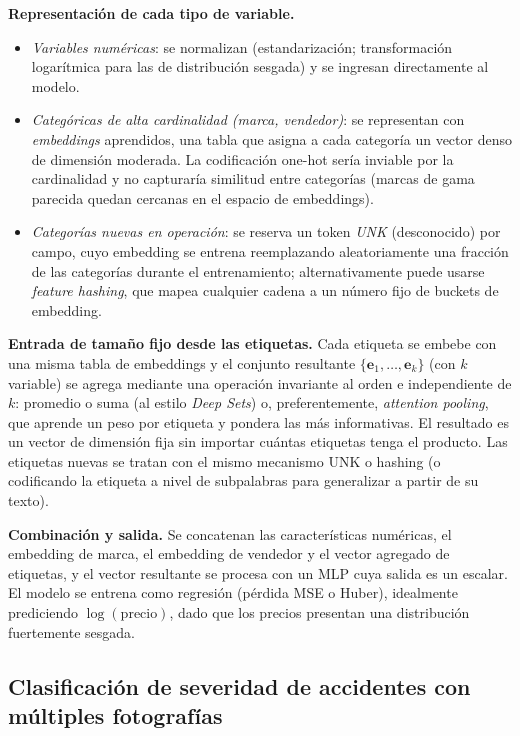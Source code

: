 \documentclass[12pt, a4paper]{article}
\begin{document}
\textbf{Representación de cada tipo de variable.}
\begin{itemize}[leftmargin=2em]
  \item \emph{Variables numéricas}: se normalizan (estandarización; transformación
        logarítmica para las de distribución sesgada) y se ingresan directamente al modelo.
  \item \emph{Categóricas de alta cardinalidad (marca, vendedor)}: se representan con
        \emph{embeddings} aprendidos, una tabla que asigna a cada categoría un vector denso
        de dimensión moderada. La codificación one-hot sería inviable por la cardinalidad y
        no capturaría similitud entre categorías (marcas de gama parecida quedan cercanas en
        el espacio de embeddings).
  \item \emph{Categorías nuevas en operación}: se reserva un token \emph{UNK} (desconocido)
        por campo, cuyo embedding se entrena reemplazando aleatoriamente una fracción de las
        categorías durante el entrenamiento; alternativamente puede usarse \emph{feature
        hashing}, que mapea cualquier cadena a un número fijo de buckets de embedding.
\end{itemize}

\textbf{Entrada de tamaño fijo desde las etiquetas.} Cada etiqueta se embebe con una misma
tabla de embeddings y el conjunto resultante $\{\mathbf{e}_1,\dots,\mathbf{e}_k\}$ (con $k$
variable) se agrega mediante una operación invariante al orden e independiente de $k$:
promedio o suma (al estilo \emph{Deep Sets}) o, preferentemente, \emph{attention pooling},
que aprende un peso por etiqueta y pondera las más informativas. El resultado es un vector
de dimensión fija sin importar cuántas etiquetas tenga el producto. Las etiquetas nuevas se
tratan con el mismo mecanismo UNK o hashing (o codificando la etiqueta a nivel de
subpalabras para generalizar a partir de su texto).

\textbf{Combinación y salida.} Se concatenan las características numéricas, el embedding de
marca, el embedding de vendedor y el vector agregado de etiquetas, y el vector resultante se
procesa con un MLP cuya salida es un escalar. El modelo se entrena como regresión (pérdida
MSE o Huber), idealmente prediciendo $\log(\text{precio})$, dado que los precios presentan
una distribución fuertemente sesgada.

\subsection{Clasificación de severidad de accidentes con múltiples fotografías}
\end{document}
